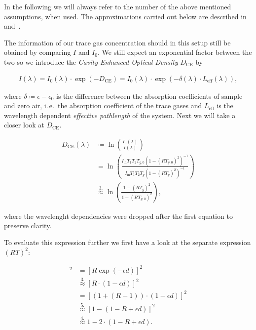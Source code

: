In the following we will always refer to the number of the above
mentioned assumptions, when used. The approximations carried out below
are described in~\cite{platt2009} and~\cite{fiedler2003}.

The information of our trace gas concentration should in this setup
still be obained by comparing $I$ and $I_0$. We still expect an
exponential factor between the two so we introduce the \emph{Cavity
  Enhanced Optical Density} $D_{\text{CE}}$ by

\begin{align}
  I(\lambda) = I_0(\lambda) \cdot \exp(- D_{\text{CE}}) = I_0(\lambda)
  \cdot \exp(-\delta(\lambda) \cdot L_{\text{eff}}(\lambda)),
\end{align}

where $\delta \coloneqq \epsilon - \epsilon_0$ is the difference
between the absorption coefficients of sample and zero air, i.\,e.\ the
absorption coefficient of the trace gases and $L_{\text{eff}}$ is the
wavelength dependent \emph{effective pathlength} of the system. Next
we will take a closer look at $D_{\text{CE}}$.

\begin{align}
  D_{\text{CE}}(\lambda) & \coloneqq \ln\left(
                           \frac{I_0(\lambda)}{I(\lambda)}\right)\nonumber\\
                         & = \ln\left ( \frac{I_{\text{in}}T_1T_2T_{g,0}(1 -
                           (RT_{g,0})^2)^{-1}}{I_{\text{in}}T_1T_2T_g(1 -
                           (RT_g)^2)^{-1}}\right)\nonumber\\
                         & \stackrel{3.}{\approx} \ln\left( \frac{1 -
                           (RT_g)^2}{1 - (RT_{g,0})^2}\right)\label{eq:d_ce},
\end{align}

where the wavelenght dependencies were dropped after the first
equation to preserve clarity. 

To evaluate this expression further we
first have a look at the separate expression $(RT)^2$:

\begin{align}
  [RT]^2 & = [R \exp(-\epsilon d)]^2 \nonumber\\
         & \stackrel{3.}{\approx} [R \cdot(1 - \epsilon d)]^2 \nonumber\\
         & = [(1 + (R - 1))\cdot (1 - \epsilon d)]^2 \nonumber\\
         & \stackrel{5.}{\approx} [1 - (1 - R + \epsilon d)]^2 \nonumber\\
         & \stackrel{4.}{\approx} 1 - 2 \cdot (1 - R + \epsilon d)\label{eq:rt}.
\end{align}

